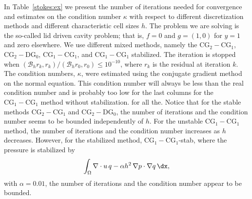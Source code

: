 In Table~\ref{stokes:ex} we present the number of iterations needed
for convergence and estimates on the condition number $\kappa$ with
respect to different discretization methods and different
characteristic cell sizes $h$. The problem we are solving is the
so-called lid driven cavity problem; that is, $f=0$ and $g = (1,0)$ for
$y=1$ and zero elsewhere.  We use different mixed methods, namely the
$\mathrm{CG}_2-\mathrm{CG}_1$, $\mathrm{CG}_2-\mathrm{DG}_0$,
$\mathrm{CG}_1-\mathrm{CG}_1$, and $\mathrm{CG}_1-\mathrm{CG}_1$
stabilized.  The iteration is stopped when $(\mathcal{B}_h r_k,
r_k)/(\mathcal{B}_h r_0, r_0) \le 10^{-10}$, where $r_k$ is the
residual at iteration $k$.  The condition numbers, $\kappa$, were
estimated using the conjugate gradient method on the normal
equation. This condition number will always be less than the real
condition number and is probably too low for the last columns for the
$\mathrm{CG}_1-\mathrm{CG}_1$ method without stabilization.  for all
the.  Notice that for the stable methods $\mathrm{CG}_2-\mathrm{CG}_1$
and $\mathrm{CG}_2-\mathrm{DG}_0$, the number of iterations and the
condition number seems to be bounded independently of $h$. For the
unstable $\mathrm{CG}_1-\mathrm{CG}_1$ method, the number of
iterations and the condition number increases as $h$
decreases. However, for the stabilized method,
$\mathrm{CG}_1-\mathrm{CG}_1$-stab, where the pressure is stabilized
by
\[
\int_\Omega \nabla \cdot u \, q  - \alpha h^2 \, \nabla p \cdot \nabla q \,
    \dx,
\]
with $\alpha=0.01$, the number of iterations and the condition number appear to be bounded.


